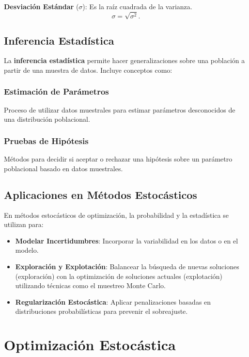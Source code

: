 \documentclass[12pt,a4,oneside]{book}
\begin{document}
	\textbf{Desviación Estándar} (\(\sigma\)): Es la raíz cuadrada de la varianza.
	\[
	\sigma = \sqrt{\sigma^2}.
	\]
	
	\subsection{Inferencia Estadística}
	
	La \textbf{inferencia estadística} permite hacer generalizaciones sobre una población a partir de una muestra de datos. Incluye conceptos como:
	
	\subsubsection{Estimación de Parámetros}
	
	Proceso de utilizar datos muestrales para estimar parámetros desconocidos de una distribución poblacional.
	
	\subsubsection{Pruebas de Hipótesis}
	
	Métodos para decidir si aceptar o rechazar una hipótesis sobre un parámetro poblacional basado en datos muestrales.
	
	\subsection{Aplicaciones en Métodos Estocásticos}
	
	En métodos estocásticos de optimización, la probabilidad y la estadística se utilizan para:
	\begin{itemize}
		\item \textbf{Modelar Incertidumbres}: Incorporar la variabilidad en los datos o en el modelo.
		\item \textbf{Exploración y Explotación}: Balancear la búsqueda de nuevas soluciones (exploración) con la optimización de soluciones actuales (explotación) utilizando técnicas como el muestreo Monte Carlo.
		\item \textbf{Regularización Estocástica}: Aplicar penalizaciones basadas en distribuciones probabilísticas para prevenir el sobreajuste.
	\end{itemize}
	
	\section{Optimización Estocástica}
	
\end{document}

